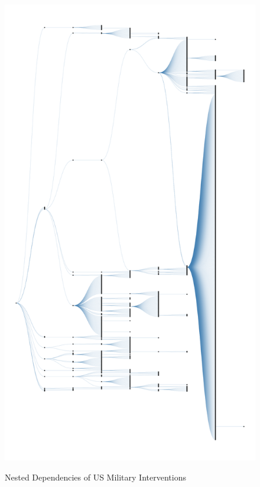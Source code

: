\documentclass[fleqn,12pt]{article}
\begin{document}
\clearpage
{}
\newpage
\begin{figure}[h]
	\begin{center}
		\caption{Nested Dependencies of US Military Interventions}
		{\includegraphics[height = \textheight]{fig-dendrogram-1.png}}
		\label{fig:fig-dendrogram-1}
		\vspace{0.1 in}
	\end{center}
\end{figure}
\end{document}
